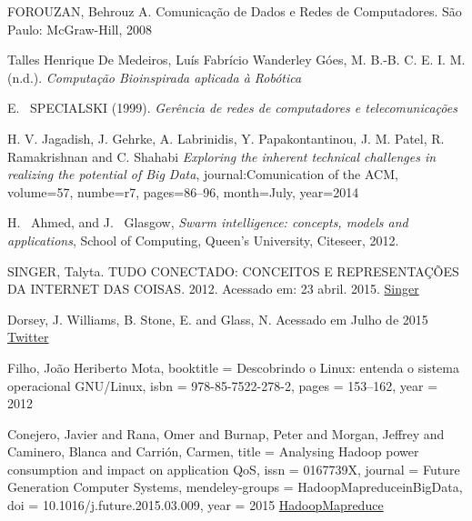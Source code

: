 \documentclass[conference,compsoc]{IEEEtran}
\begin{document}
%
%
%
\begin{thebibliography}{1}

FOROUZAN, Behrouz A. Comunicação de Dados e Redes de Computadores. São Paulo: McGraw-Hill, 2008

Talles Henrique De Medeiros, Luís Fabrício Wanderley Góes, M. B.-B. C. E. I. M. (n.d.). 
\emph{Computação Bioinspirada aplicada à Robótica}

E. ~SPECIALSKI (1999).
\emph{Gerência de redes de computadores e telecomunicações}

  H. V. Jagadish, J. Gehrke, A. Labrinidis, Y. Papakontantinou, J. M. Patel, R. Ramakrishnan and C. Shahabi
  \emph{Exploring the inherent technical challenges in realizing the potential of Big Data},
  journal:Comunication of the ACM, volume=57, numbe=r7, pages=86--96, month=July, year=2014

H. ~Ahmed, and J. ~Glasgow,
\emph{Swarm intelligence: concepts, models and applications},
\relax School of Computing, Queen's University, Citeseer, 2012.

SINGER, Talyta. TUDO CONECTADO: CONCEITOS E REPRESENTAÇÕES DA INTERNET DAS COISAS. 2012.
Acessado em: 23 abril. 2015.
\href{http://www.simsocial2012.ufba.br/modulos/submissao/Upload/44965.pdf} {Singer}

Dorsey, J. Williams, B. Stone, E. and Glass, N.
Acessado em Julho de 2015
\href {https://pt.wikipedia.org/wiki/Twitter}
{Twitter}

Filho, João Heriberto Mota,
booktitle = {Descobrindo o Linux: entenda o sistema operacional GNU/Linux},
isbn = {978-85-7522-278-2},
pages = {153--162},
year = {2012}

Conejero, Javier and Rana, Omer and Burnap, Peter and Morgan, Jeffrey and Caminero, Blanca and Carri{\'{o}}n, Carmen,
title = {{Analysing Hadoop power consumption and impact on application QoS}},
issn = {0167739X},
journal = {Future Generation Computer Systems},
mendeley-groups = {HadoopMapreduceinBigData},
doi = {10.1016/j.future.2015.03.009},
year = {2015}
\href{http://linkinghub.elsevier.com/retrieve/pii/S0167739X15000643}{HadoopMapreduce}




\end{thebibliography}
\end{document}

